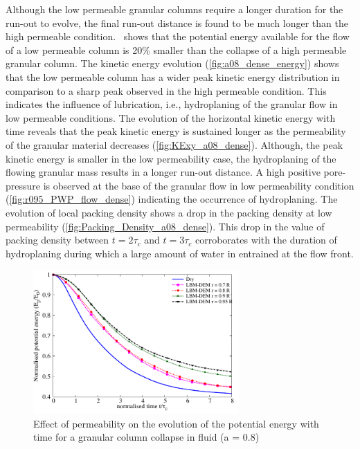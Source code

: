 Although the low permeable granular columns require a longer duration for the 
run-out to evolve, the final run-out distance is found to be much longer than 
the high permeable condition.~ shows that the potential 
energy available for the flow of a low permeable column is 20\% smaller than 
the collapse of a high permeable granular column. The kinetic energy evolution 
(\cref{fig:a08_dense_energy}) shows that the low permeable column has a 
wider peak kinetic energy distribution in comparison to a sharp peak observed 
in the high permeable condition. This indicates the influence of lubrication, 
i.e., 
hydroplaning of the granular flow in low permeable conditions. The evolution of 
the horizontal kinetic energy with time reveals that the peak kinetic energy is 
sustained longer as the permeability of the granular material decreases 
(\cref{fig:KExy_a08_dense}). Although, the peak kinetic energy is smaller 
in the low permeability case, the hydroplaning of the flowing granular mass 
results in a longer run-out distance. A high positive pore-pressure is observed 
at the base of the granular flow in low permeability condition 
(\cref{fig:r095_PWP_flow_dense}) indicating the occurrence of hydroplaning. The 
evolution of local packing density shows a drop in the packing density at low 
permeability (\cref{fig:Packing_Density_a08_dense}). This drop in the value 
of packing density between $t = 2\tau_c$ and $t=3\tau_c$ corroborates with the 
duration of hydroplaning during which a large amount of water in entrained at 
the flow front.  

\begin{figure}
	\centering
    \includegraphics[width=0.7\textwidth]{PE_a08_dense}
    \caption{Effect of permeability on the evolution of the potential energy 
    with time for a granular column collapse in fluid (a = 0.8)}
    \label{fig:PE_a08_dense}
\end{figure}

